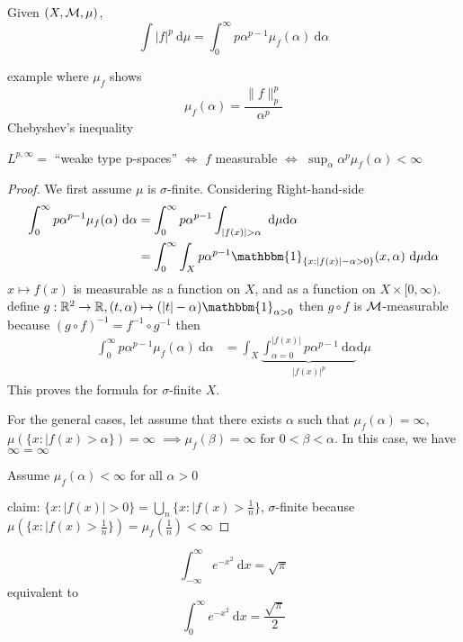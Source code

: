 \begin{theorem}
  Given $(X, \mathcal M, \mu)$, 
  \[\int |f|^p \ \mathrm{d}\mu = \int_0^\infty p\alpha^{p-1} \mu_f(\alpha) \ \mathrm{d}\alpha\]
\end{theorem}

\begin{example}
  example where $\mu_f$ shows
  \[\mu_f(\alpha) = \frac{\|f\|^p_p}{\alpha^p}\]
  Chebyshev's inequality

  $L^{p, \infty} =$ ``weake type p-spaces'' $\iff$ $f$ measurable $\iff$ $\sup_{\alpha} \alpha^p \mu_f(\alpha) < \infty$
\end{example}

\begin{proof}
  We first assume $\mu$ is $\sigma$-finite.
  Considering Right-hand-side 
  \begin{align*}
    \int_0^\infty p\alpha^{p-1} \mu_f(\alpha) \ \mathrm{d}\alpha &= \int_0^\infty p\alpha^{p-1}\int_{|f(x)| > \alpha} \ \mathrm{d}\mu \mathrm{d}\alpha\\
    &= \int_0^\infty \int_X p\alpha^{p-1} \mathbbm{1}_{\{x : |f(x)| - \alpha > 0\}} (x, \alpha) \ \mathrm{d}\mu \mathrm{d}\alpha
  \end{align*}
  $x \mapsto f(x)$ is measurable as a function on $X$, and as a function on $X\times [0, \infty)$. 
  define $g: \RR^2 \to \RR, (t, \alpha) \mapsto (|t| - \alpha)\mathbbm{1}_{\alpha > 0}$ then $g \circ f$ is $\mathcal M$-measurable 
  because $(g \circ f)^{-1} = f^{-1} \circ g^{-1}$ then
  \begin{align*}
    \int_0^\infty p\alpha^{p-1} \mu_f(\alpha) \ \mathrm{d}\alpha &= \int_X \underbrace{\int_{\alpha=0}^{|f(x)|} p\alpha^{p-1} \ \mathrm{d}\alpha}_{|f(x)|^p}\mathrm{d}\mu  
  \end{align*}
  This proves the formula for $\sigma$-finite $X$.

  For the general cases, let assume that there exists $\alpha$ such that $\mu_f(\alpha) = \infty$,
  $\mu(\{x : |f(x) > \alpha\}) = \infty$ $\implies \mu_f(\beta) = \infty$ for $0 < \beta < \alpha$.
  In this case, we have $\infty = \infty$

  Assume $\mu_f(\alpha) < \infty$ for all $\alpha > 0$

  claim: $\{x : |f(x)| > 0\} = \bigcup_{n} \{x : |f(x) > \frac1n \}$, $\sigma$-finite because 
  $ \mu(\{x : |f(x) > \frac1n \}) = \mu_f(\frac{1}n)< \infty$
\end{proof}

\begin{example}
  \[\int_{-\infty}^\infty e^{-x^2} \ \mathrm{d}x = \sqrt\pi\]
  equivalent to
  \[\int_{0}^\infty e^{-x^2} \ \mathrm{d}x = \frac{\sqrt\pi}2\]
 

\end{example}

